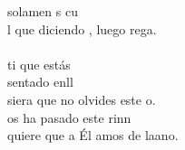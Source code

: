 \begin{cancion}
	solamen s cu  \\
	l que diciendo , luego rega.\\
\jump\\
	ti que estás \\
	sentado enll  \\
	siera que no olvides este o.\\
	os ha pasado  este rinn \\
	quiere que a Él amos de laano.\\
\end{cancion}%
